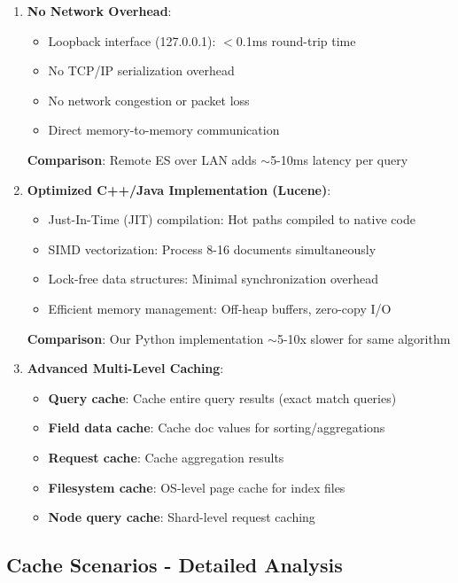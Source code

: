 \documentclass[12pt,a4paper]{article}
\begin{document}
\begin{enumerate}
    \item \textbf{No Network Overhead}:
    \begin{itemize}
        \item Loopback interface (127.0.0.1): $<$0.1ms round-trip time
        \item No TCP/IP serialization overhead
        \item No network congestion or packet loss
        \item Direct memory-to-memory communication
    \end{itemize}
    
    \textbf{Comparison}: Remote ES over LAN adds $\sim$5-10ms latency per query
    
    \item \textbf{Optimized C++/Java Implementation (Lucene)}:
    \begin{itemize}
        \item Just-In-Time (JIT) compilation: Hot paths compiled to native code
        \item SIMD vectorization: Process 8-16 documents simultaneously
        \item Lock-free data structures: Minimal synchronization overhead
        \item Efficient memory management: Off-heap buffers, zero-copy I/O
    \end{itemize}
    
    \textbf{Comparison}: Our Python implementation $\sim$5-10x slower for same algorithm
    
    \item \textbf{Advanced Multi-Level Caching}:
    \begin{itemize}
        \item \textbf{Query cache}: Cache entire query results (exact match queries)
        \item \textbf{Field data cache}: Cache doc values for sorting/aggregations
        \item \textbf{Request cache}: Cache aggregation results
        \item \textbf{Filesystem cache}: OS-level page cache for index files
        \item \textbf{Node query cache}: Shard-level request caching
    \end{itemize}
\end{enumerate}

\subsection{Cache Scenarios - Detailed Analysis}
\end{document}
